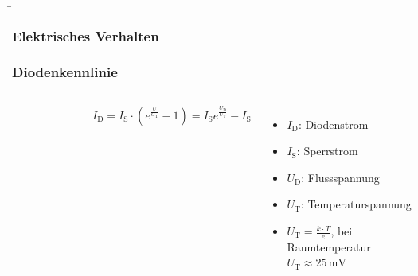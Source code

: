 \begin{frame}
    \b{
        \subsubsection{Elektrisches Verhalten}
        \frametitle{Diodenkennlinie}
        \begin{columns}
            \begin{figure}[H]
                \centering
                
            \end{figure}

            $I_\mathrm{D} = I_\mathrm{S} \cdot (e^{\frac{U}{U_\mathrm{T}}} - 1) = I_\mathrm{S}  e^{\frac{U_\mathrm{D}}{U_\mathrm{T}}} - I_\mathrm{S}$
            \begin{itemize}
                \item $I_\mathrm{D}$: Diodenstrom
                \item $I_\mathrm{S}$: Sperrstrom
                \item $U_\mathrm{D}$: Flussspannung
                \item $U_\mathrm{T}$: Temperaturspannung
                \item $U_\mathrm{T} = \frac{k \cdot T}{e}$, bei Raumtemperatur $U_\mathrm{T} \approx 25\,\mathrm{mV}$
            \end{itemize}
        \end{columns}}

\end{frame}

